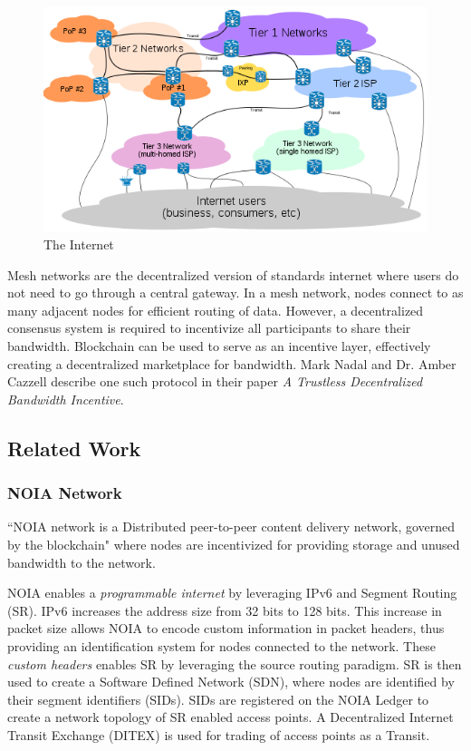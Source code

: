 	\begin{figure}[h]
		\includegraphics[width=\linewidth]{figures/internet-backbone}
		\caption{\label{fig:internet-backbone} The Internet\protect\cite{image:internet:1}}
	\end{figure}
	
	Mesh networks are the decentralized version of standards internet where users do not need to go through a central gateway. In a mesh network, nodes connect to as many adjacent nodes for efficient routing of data. However, a decentralized consensus system is required to incentivize all participants to share their bandwidth. Blockchain can be used to serve as an incentive layer, effectively creating a decentralized marketplace for bandwidth. Mark Nadal and Dr. Amber Cazzell describe one such protocol in their paper \textit{A Trustless Decentralized Bandwidth Incentive}\cite{nadal2019amber}.
	
	\subsection{Related Work}
		\subsubsection{NOIA Network}
		``NOIA\cite{noia:doc:cache:1} network is a Distributed peer-to-peer content delivery network, governed by the blockchain" where nodes are incentivized for providing storage and unused bandwidth to the network.
		
		NOIA enables a \textit{programmable internet}\cite{noia:whitepaper:1} by leveraging IPv6 and Segment Routing (SR). IPv6 increases the address size from 32 bits to 128 bits. This increase in packet size allows NOIA to encode custom information in packet headers, thus providing an identification system for nodes connected to the network. These \textit{custom headers}\cite{noia:doc:ipv6:1} enables SR by leveraging the source routing paradigm. SR is then used to create a Software Defined Network (SDN), where nodes are identified by their segment identifiers (SIDs). SIDs are registered on the NOIA Ledger to create a network topology of SR enabled access points. A Decentralized Internet Transit Exchange (DITEX) is used for trading of access points as a Transit.
		
